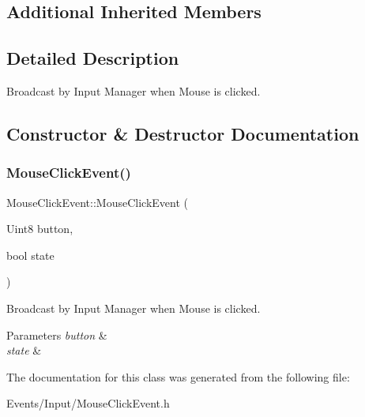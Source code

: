 \subsection*{Additional Inherited Members}


\subsection{Detailed Description}
Broadcast by Input Manager when Mouse is clicked. 

\subsection{Constructor \& Destructor Documentation}
\mbox{\label{classMouseClickEvent_aaeb5699200d246773b7be56e1565171e}} 
\subsubsection{\texorpdfstring{Mouse\+Click\+Event()}{MouseClickEvent()}}
{\footnotesize\ttfamily Mouse\+Click\+Event\+::\+Mouse\+Click\+Event (\begin{DoxyParamCaption}\item[{Uint8}]{button,  }\item[{bool}]{state }\end{DoxyParamCaption})\hspace{0.3cm}{\ttfamily [inline]}}



Broadcast by Input Manager when Mouse is clicked. 


\begin{DoxyParams}{Parameters}
{\em button} & \\
\hline
{\em state} & \\
\hline
\end{DoxyParams}


The documentation for this class was generated from the following file\+:\begin{DoxyCompactItemize}
\item 
Events/\+Input/Mouse\+Click\+Event.\+h\end{DoxyCompactItemize}
